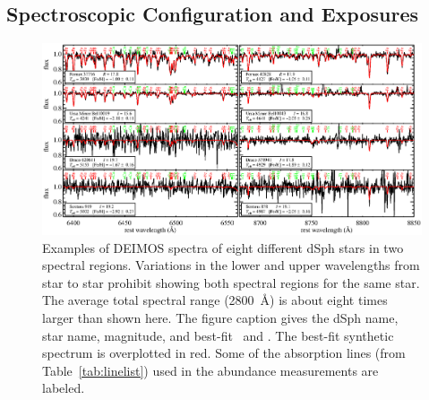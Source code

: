 \documentclass{emulateapj}
\begin{document}
\subsection{Spectroscopic Configuration and Exposures}
\label{sec:exposures}

\begin{figure}[ht!]
\centering
\includegraphics[width=\textwidth]{snexamples.eps}
\caption{Examples of DEIMOS spectra of eight different dSph stars in
  two spectral regions.  Variations in the lower and upper wavelengths
  from star to star prohibit showing both spectral regions for the
  same star.  The average total spectral range (2800~\AA) is about
  eight times larger than shown here.  The figure caption gives the
  dSph name, star name, magnitude, and best-fit \teff\ and \feh.  The
  best-fit synthetic spectrum is overplotted in red.  Some of the
  absorption lines (from Table~\ref{tab:linelist}) used in the
  abundance measurements are labeled.\label{fig:snexamples}}
\end{figure}
\end{document}
